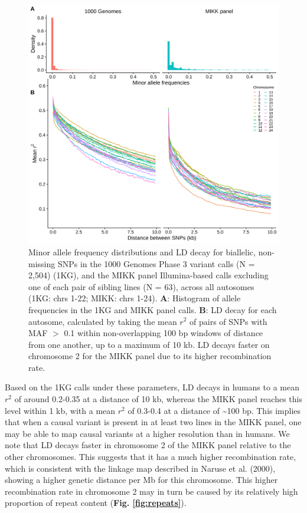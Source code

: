 \documentclass[
]{book}
\begin{document}
\begin{figure}
\includegraphics[width=1\linewidth]{figs/mikk_genome/08_ld_decay} \caption{Minor allele frequency distributions and LD decay for biallelic, non-missing SNPs in the 1000 Genomes Phase 3 variant calls (N = 2,504) (1KG), and the MIKK panel Illumina-based calls excluding one of each pair of sibling lines (N = 63), across all autosomes (1KG: chrs 1-22; MIKK: chrs 1-24). \textbf{A}: Histogram of allele frequencies in the 1KG and MIKK panel calls. \textbf{B}: LD decay for each autosome, calculated by taking the mean \(r^2\) of pairs of SNPs with MAF \(>\) 0.1 within non-overlapping 100 bp windows of distance from one another, up to a maximum of 10 kb. LD decays faster on chromosome 2 for the MIKK panel due to its higher recombination rate.}\label{fig:LDdecay}
\end{figure}

Based on the 1KG calls under these parameters, LD decays in humans to a mean \(r^2\) of around 0.2-0.35 at a distance of 10 kb, whereas the MIKK panel reaches this level within 1 kb, with a mean \(r^2\) of 0.3-0.4 at a distance of \textasciitilde100 bp. This implies that when a causal variant is present in at least two lines in the MIKK panel, one may be able to map causal variants at a higher resolution than in humans. We note that LD decays faster in chromosome 2 of the MIKK panel relative to the other chromosomes. This suggests that it has a much higher recombination rate, which is consistent with the linkage map described in Naruse et al. (2000), showing a higher genetic distance per Mb for this chromosome. This higher recombination rate in chromosome 2 may in turn be caused by its relatively high proportion of repeat content (\textbf{Fig. \ref{fig:repeats}}).
\end{document}
